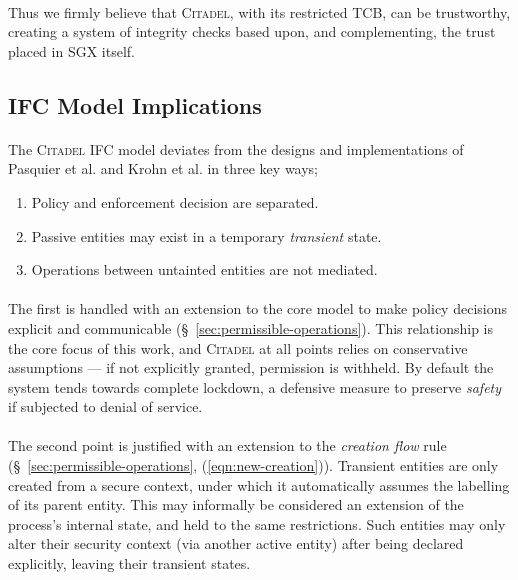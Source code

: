 \paragraph{} Thus we firmly believe that \textsc{Citadel}, with its restricted TCB, can be trustworthy, creating a system of integrity checks based upon, and complementing, the trust placed in SGX itself.

\subsection{IFC Model Implications}
\label{sec:ifc-model-implications}

\paragraph{} The \textsc{Citadel} IFC model deviates from the designs and implementations of Pasquier et al. and Krohn et al. in three key ways;
\begin{enumerate}
    \item Policy and enforcement decision are separated.
    \item Passive entities may exist in a temporary \textit{transient} state.
    \item Operations between untainted entities are not mediated.
\end{enumerate}

\paragraph{} The first is handled with an extension to the core model to make policy decisions explicit and communicable (§~\ref{sec:permissible-operations}). This relationship is the core focus of this work, and \textsc{Citadel} at all points relies on conservative assumptions --- if not explicitly granted, permission is withheld. By default the system tends towards complete lockdown, a defensive measure to preserve \textit{safety} if subjected to denial of service.

\paragraph{} The second point is justified with an extension to the \textit{creation flow} rule (§~\ref{sec:permissible-operations}, (\ref{eqn:new-creation})). Transient entities are only created from a secure context, under which it automatically assumes the labelling of its parent entity. This may informally be considered an extension of the process's internal state, and held to the same restrictions. Such entities may only alter their security context (via another active entity) after being declared explicitly, leaving their transient states. 

